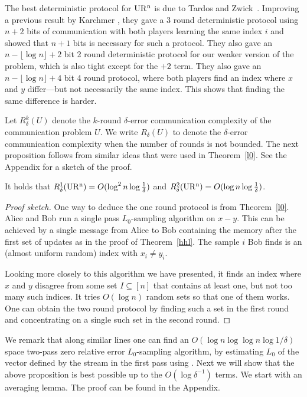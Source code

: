 The best deterministic protocol for $\operatorname{UR^n}$ is due to 
 Tardos and Zwick~\cite{TardosZwick}. Improving a previous result 
 by Karchmer \cite{Karchmer}, they gave a 3 round deterministic protocol 
 using $n+2$ bits of communication with both players learning the same index
 $i$ and showed that $n+1$ bits is necessary for such a protocol. They also
 gave an $n-\lfloor\log n\rfloor+2$ bit 2 round deterministic protocol for our
 weaker version of the problem, which is also tight except for the $+2$
 term. They also gave an $n-\lfloor\log n\rfloor+4$ bit 4 round protocol, where
 both players find an index where $x$ and $y$ differ---but not necessarily
 the same index. This shows that finding the same difference is harder.

Let $R^k_\delta(U)$ denote the $k$-round $\delta$-error communication
complexity of the communication problem $U$. We write $R_\delta(U)$ to denote
the $\delta$-error communication complexity when the number of rounds is not
bounded. The next proposition follows from similar ideas that were used in 
Theorem~\ref{l0}. See the Appendix for a sketch of the proof.

\begin{proposition}\label{thm:urub}
It holds that $R^1_\delta(\operatorname{UR^n})=O(\log^2 n\log\frac{1}{\delta})$ and $R^2_\delta(\operatorname{UR^n})=O(\log n\log\frac{1}{\delta})$.
\end{proposition}

\begin{proof}[Proof sketch] One way to deduce the one round protocol is from
  Theorem~\ref{l0}. Alice and Bob run a single pass $L_0$-sampling algorithm
  on $x-y$. This can be achieved by a single message from Alice to Bob
  containing the memory after the first set of updates as in the proof of
  Theorem~\ref{hhl}. The sample $i$ Bob finds is an (almost uniform random)
  index with $x_i\ne y_i$.

Looking more closely to this algorithm we have presented, it finds an index
where $x$ and $y$ disagree from some set $I\subseteq[n]$ that contains at
least one, but not too many such indices. It tries $O(\log n)$ random sets so
that one of them works. One can obtain the two round
protocol by finding such a set in the first round and concentrating on a
single such set in the second round.
\end{proof}

We remark that along similar lines one can find an $O(\log n \log\log n\log1/\delta )$
space two-pass zero relative error $L_0$-sampling algorithm, by estimating  $L_0$ 
of the vector defined by the stream in the first pass using \cite{KaneNW10}. Next
 we will show that the above proposition is best possible up to the $O(\log\delta^{-1})$
terms. We start with an averaging lemma. The proof can be found in the Appendix.


